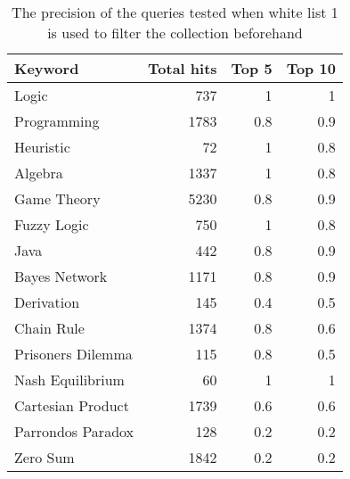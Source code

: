 \begin{table}[h!]
\centering
\begin{tabular} {|| p{15em} | r | r | r ||} 
 \hline
 Keyword & Total hits & Top 5 & Top 10 \\ [0.5ex] 
 \hline

Logic & 737 & 1 & 1 \\
Programming & 1783 & 0.8 & 0.9 \\
Heuristic & 72 & 1 & 0.8 \\
Algebra & 1337 & 1 & 0.8 \\
Game Theory & 5230 & 0.8 & 0.9 \\
\hline
Fuzzy Logic & 750 & 1 & 0.8 \\
Java & 442 & 0.8 & 0.9 \\
Bayes Network & 1171 & 0.8 & 0.9 \\
Derivation & 145 & 0.4 & 0.5 \\
\hline
Chain Rule & 1374 & 0.8 & 0.6 \\
Prisoners Dilemma & 115 & 0.8 & 0.5 \\
Nash Equilibrium & 60 & 1 & 1 \\
Cartesian Product & 1739 & 0.6 & 0.6 \\
Parrondos Paradox & 128 & 0.2 & 0.2 \\
Zero Sum & 1842 & 0.2 & 0.2 \\

 \hline
\end{tabular}
\caption{The precision of the queries tested when white list 1 is used to filter the collection beforehand}
\label{table:p_test_list1}
\end{table}

